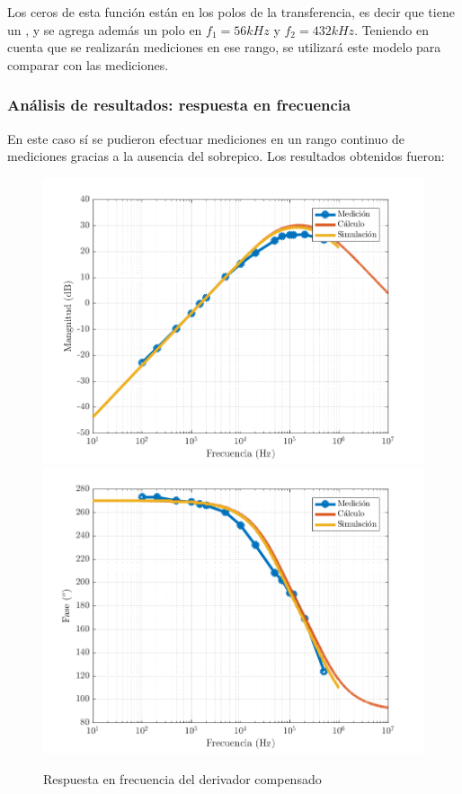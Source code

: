 \documentclass[../../main.tex]{subfiles}
\begin{document}
Los ceros de esta funci\'on est\'an en los polos de la transferencia, es decir que tiene un , y se agrega adem\'as un polo en $f_1 =  56kHz$ y $f_2 = 432kHz$. Teniendo en cuenta que se realizar\'an mediciones en ese rango, se utilizar\'a este modelo para comparar con las mediciones.

\subsubsection{An\'alisis de resultados: respuesta en frecuencia}

En este caso s\'i se pudieron efectuar mediciones en un rango continuo de mediciones gracias a la ausencia del sobrepico. Los resultados obtenidos fueron:

\begin{figure}  [H]
	\centering
	\label{fig:dcomp-hf}
	\includegraphics[scale=0.7]{fotos/tc_tp2_ej4_dcomp_Hf_mag.png}
	\includegraphics[scale=0.7]{fotos/tc_tp2_ej4_dcomp_Hf_fase.png}
	\caption{Respuesta en frecuencia del derivador compensado}
\end{figure}
\end{document}
